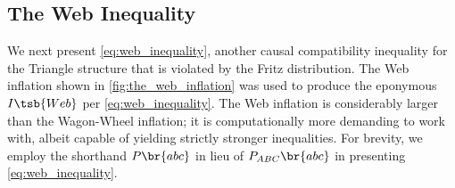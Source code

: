 \documentclass[aps, 10pt, english, twoside, pra, nofootinbib, tightenlines, longbibliography, superscriptaddress]{revtex4-1}
\begin{document}



    \subsection{The Web Inequality}
    \label{sec:noise}
    \label{sec:violations_noise}
    We next present \cref{eq:web_inequality}, another causal compatibility inequality for the Triangle structure that is violated by the Fritz distribution. The Web inflation shown in \cref{fig:the_web_inflation} was used to produce the eponymous $I\tsb{Web}$ per \cref{eq:web_inequality}.  The Web inflation is considerably larger than the Wagon-Wheel inflation; it is computationally more demanding to work with, albeit capable of yielding strictly stronger inequalities. For brevity, we employ the shorthand $\prob\br{abc}$ in lieu of $\prob[ABC]\br{abc}$ in presenting \cref{eq:web_inequality}.
\end{document}

